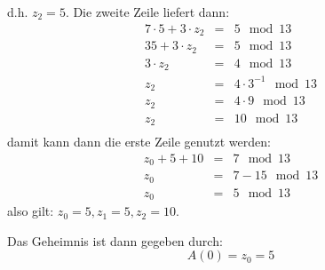 \documentclass[DIN, pagenumber=false, fontsize=11pt, parskip=half]{scrartcl}
\begin{document}
    d.h. $z_2 = 5$. Die zweite Zeile liefert dann:
    \begin{eqnarray}
        7 \cdot 5 + 3 \cdot z_2 &=& 5 \mod 13 \\
        35 + 3 \cdot z_2 &=& 5 \mod 13 \\
        3 \cdot z_2 &=& 4 \mod 13 \\
        z_2 &=& 4 \cdot 3^{-1} \mod 13 \\
        z_2 &=& 4 \cdot 9 \mod 13 \\
        z_2 &=& 10 \mod 13 \\
    \end{eqnarray}
    damit kann dann die erste Zeile genutzt werden:
    \begin{eqnarray}
        z_0 + 5 + 10 &=& 7 \mod 13 \\
        z_0 &=& 7 - 15 \mod 13 \\
        z_0 &=& 5 \mod 13
    \end{eqnarray}
    also gilt: $z_0 = 5, z_1 = 5, z_2 = 10$.

    Das Geheimnis ist dann gegeben durch:
    \begin{equation}
        A(0) = z_0 = 5
    \end{equation}
\end{document}
